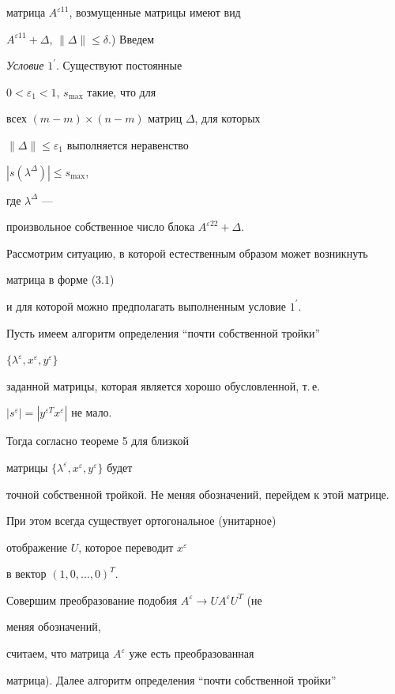 матрица $A^{\varepsilon 11}$, возмущенные матрицы имеют вид


$A^{\varepsilon 11}+\Delta$, $\|\Delta\|\le \delta$.) Введем





{\it Условие} $1^\prime$. Существуют постоянные


$0<\varepsilon_1<1$, $s_{\max}$ такие, что для


всех $(m-m)\times(n-m)$ матриц $\Delta$, для которых


$\|\Delta\|\le\varepsilon_1$ выполняется неравенство


$|s(\lambda^{\Delta})|\le s_{\max}$,


где $\lambda^{\Delta}$ ---


произвольное собственное число блока $A^{\varepsilon 22}+\Delta$.





Рассмотрим ситуацию, в которой естественным образом может возникнуть


матрица в форме (3.1)


и для которой можно предполагать выполненным условие $1^\prime$.


Пусть имеем алгоритм определения ``почти собственной тройки''


$\{\lambda^{\varepsilon},x^{\varepsilon},y^{\varepsilon}\}$


заданной матрицы, которая является хорошо обусловленной, т.\,е.


$|s^{\varepsilon}|=|y^{\varepsilon T} x^{\varepsilon}|$ не мало.


Тогда согласно теореме 5 для близкой 


матрицы $\{\lambda^{\varepsilon}, x^{\varepsilon},y^{\varepsilon}\}$ будет


точной собственной тройкой. Не меняя обозначений, перейдем к этой матрице.


При этом всегда существует ортогональное (унитарное)


отображение $U$, которое переводит $x^{\varepsilon}$


в вектор $(1,0,\dotsc,0)^T$.


Совершим преобразование подобия $A^{\varepsilon}\to UA^{\varepsilon}U^T$ (не


меняя обозначений,


считаем, что матрица $A^{\varepsilon}$ уже есть преобразованная


матрица). Далее алгоритм определения ``почти собственной тройки''


